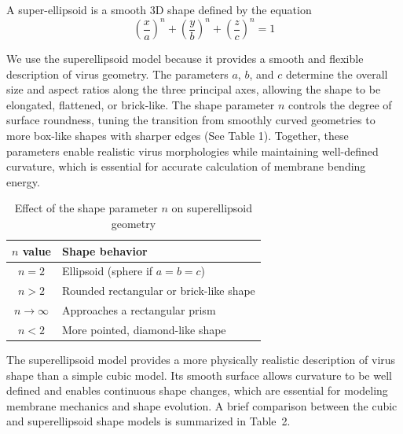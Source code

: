 \documentclass[12pt]{article}
\begin{document}
\begin{flushleft}
A super-ellipsoid is a smooth 3D shape defined by the equation
\begin{equation}
\left( \frac{x}{a} \right)^n+\left( \frac{y}{b} \right)^n+\left( \frac{z}{c} \right)^n= 1
\end{equation}

\indent We use the superellipsoid model because it provides a smooth and flexible description of virus geometry. The parameters $a$, $b$, and $c$ determine the overall size and aspect ratios along the three principal axes, allowing the shape to be elongated, flattened, or brick-like. The shape parameter $n$ controls the degree of surface roundness, tuning the transition from smoothly curved geometries to more box-like shapes with sharper edges (See Table 1). Together, these parameters enable realistic virus morphologies while maintaining well-defined curvature, which is essential for accurate calculation of membrane bending energy.\\

\begin{table}[h!]
\centering
\caption{Effect of the shape parameter \(n\) on superellipsoid geometry}
\label{tab:superellipsoid_n}
\begin{tabular}{c l}
\hline
\(n\) value & Shape behavior \\
\hline
\(n = 2\) 
& Ellipsoid (sphere if \(a = b = c\)) \\

\(n > 2\) 
& Rounded rectangular or brick-like shape \\

\(n \rightarrow \infty\) 
& Approaches a rectangular prism \\

\(n < 2\) 
& More pointed, diamond-like shape \\
\hline
\end{tabular}
\end{table}

The superellipsoid model provides a more physically realistic description of virus shape than a simple cubic model. Its smooth surface allows curvature to be well defined and enables continuous shape changes, which are essential for modeling membrane mechanics and shape evolution. A brief comparison between the cubic and superellipsoid shape models is summarized in Table~2.




\begin{table}[h!]
\centering
\caption{Comparison of Rectangular Prism and Superellipsoid Shape Models}
\label{tab:prism_vs_superellipsoid}
\footnotesize%



\end{table}
\end{flushleft}
\end{document}
